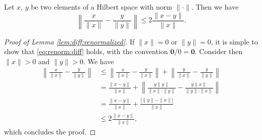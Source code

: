 \documentclass[10pt,a4paper]{amsart}
\begin{document}
\begin{Lemma}
	\label{lem:diff:renormalized}
	Let $x$, $y$ be two elements of a Hilbert space with  norm $\| \cdot \|$. Then we have
	\begin{equation} \label{eq:renorm:diff}
		\left\|  
		\frac{x}{\|x\|}
		-
		\frac{y}{\|y\|}
		\right\|
		\le 
		2 
		\frac{\|x-y\|}{\|x\|}.
	\end{equation}
\end{Lemma} 

\begin{proof}[Proof of Lemma \ref{lem:diff:renormalized}]
	If $\| x\| =0$ or $\| y\| =0$, it is simple to show that \eqref{eq:renorm:diff} holds, with the convention $\mathbf{0}/0 = \mathbf{0}$.
	Consider then $\| x\| > 0$ and $\| y\|  > 0$.  
	We have
	\begin{align*}
		\left\|  
		\frac{x}{\|x\|}
		-
		\frac{y}{\|y\|}
		\right\|
		&
		\le 
		\left\|  
		\frac{x}{\|x\|}
		-
		\frac{y}{\|x\|}
		\right\|
		+
		\left\|  
		\frac{y}{\|x\|}
		-
		\frac{y}{\|y\|}
		\right\|
		\\ & =
		\frac{\| x-y \|}{\|x\|}
		+
		\left\|  
		\frac{y \| y\|}{\|x\| \cdot \|y\| }
		-
		\frac{y \| x\|}{\|y\| \cdot \|x \|}
		\right\|
		\\ 
		& = 
		\frac{\| x-y \|}{\|x\|}
		+
		\frac{\left| \| y\| - \| x\| \right|}{\|x\|}
		\\ 
		& \le 
		2 \frac{\| x-y \|}{\|x\|},
	\end{align*}
	which concludes the proof.
\end{proof}
\end{document}
